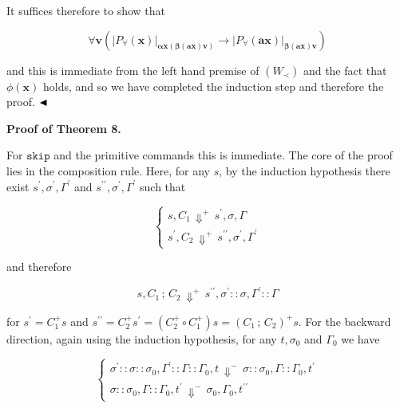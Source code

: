 \documentclass[10pt,a4paper]{article}
\begin{document}
It suffices therefore to show that\par
  
\par  \quad  \[\forall\bm{v}\left(|{P_{\forall}(\bm{x})}|_{\bm{\alpha}\bm{x}(\bm{\beta}(\bm{a}\bm{x})\bm{v})}\to|{P_{\forall}(\bm{a}\bm{x})}|_{\bm{\beta}(\bm{a}\bm{x})\bm{v}}\right)\]\quad  \quad  
  
and this is immediate from the left hand premise of $(W_{\prec})$ and the fact that $\phi(\bm{x})$ holds, and so we have completed the induction step and therefore the proof. $\hfill\blacktriangleleft$\par
 
 
 
 
\par\medskip\noindent\textbf{Proof of Theorem 8.}\par
 
 
For $\mathtt{skip}$ and the primitive commands this is immediate. The core of the proof lies in the composition rule. Here, for any $s$, by the induction hypothesis there exist $s^{\prime},\sigma^{\prime},\Gamma^{\prime}$ and $s^{\prime\prime},\sigma^{\prime},\Gamma^{\prime}$ such that\par
  
\par  \quad  \[\begin{cases}{s},{C_{1}}\,{\Downarrow^{+}}\,{s^{\prime}},{\sigma},{\Gamma}\\
{s^{\prime}},{C_{2}}\,{\Downarrow^{+}}\,{s^{\prime\prime}},{\sigma^{\prime}},{\Gamma^{\prime}}\end{cases}\]\quad  \quad  
  
and therefore\par
  
\par  \quad  \[{s},{{C_{1}}\,;\,{C_{2}}}\,{\Downarrow^{+}}\,{s^{\prime\prime}},{\sigma^{\prime}::\sigma},{\Gamma^{\prime}::\Gamma}\]\quad  \quad  
  
for $s^{\prime}=C_{1}^{+}s$ and $s^{\prime\prime}=C_{2}^{+}s^{\prime}=(C_{2}^{+}\circ C^{+}_{1})s=({C_{1}}\,;\,{C_{2}})^{+}s$. For the backward direction, again using the induction hypothesis, for any $t,\sigma_{0}$ and $\Gamma_{0}$ we have\par
  
\par  \quad  \[\begin{cases}{\sigma^{\prime}::\sigma::\sigma_{0}},{\Gamma^{\prime}::\Gamma::\Gamma_{0}},{t}\,{\Downarrow^{-}}\,{\sigma::\sigma_{0}},{\Gamma::\Gamma_{0}},{t^{\prime}}\\
{\sigma::\sigma_{0}},{\Gamma::\Gamma_{0}},{t^{\prime}}\,{\Downarrow^{-}}\,{\sigma_{0}},{\Gamma_{0}},{t^{\prime\prime}}\end{cases}\]\quad  \quad  
  
\end{document}
